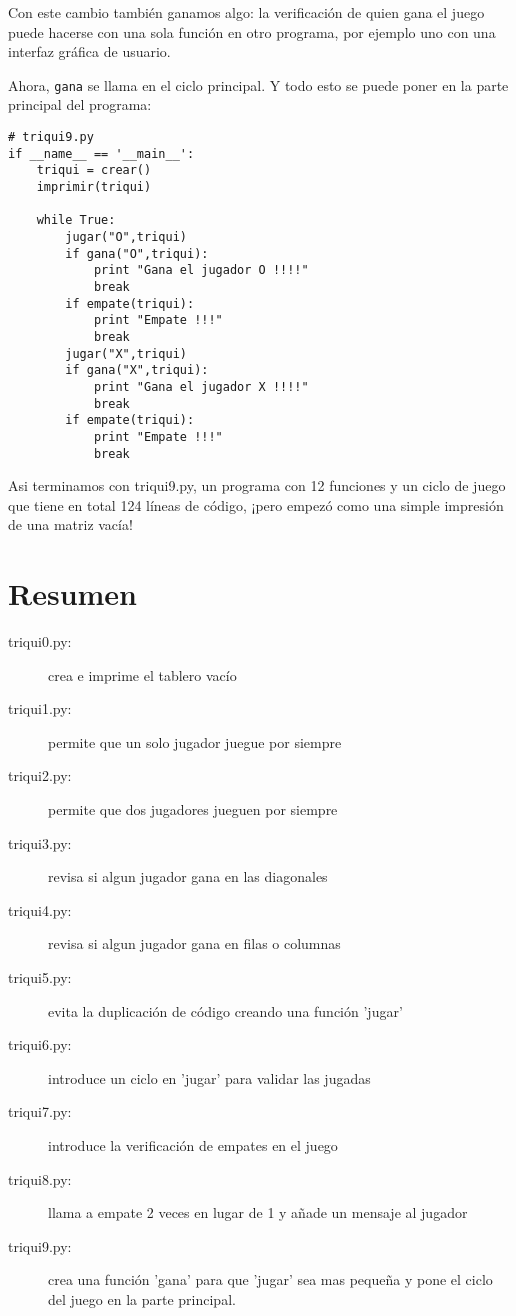 Con este cambio también ganamos algo: la verificación de quien gana el juego
puede hacerse con una sola función en otro programa, por ejemplo uno con 
una interfaz gráfica de usuario.

Ahora, \texttt{gana} se llama en el ciclo principal. Y todo esto se puede poner en 
la parte principal del programa:

\begin{verbatim}
# triqui9.py
if __name__ == '__main__':
    triqui = crear()
    imprimir(triqui)

    while True:
        jugar("O",triqui)
        if gana("O",triqui):
            print "Gana el jugador O !!!!"
            break
        if empate(triqui):
            print "Empate !!!"
            break
        jugar("X",triqui)
        if gana("X",triqui):
            print "Gana el jugador X !!!!"
            break
        if empate(triqui):
            print "Empate !!!"
            break
\end{verbatim}
\afterverb

Asi terminamos con triqui9.py, un programa con 12 funciones y un ciclo de juego que
tiene en total 124 líneas de código, ¡pero empezó como una simple impresión de una 
matriz vacía!

\section{Resumen}

\begin{description}
\item[triqui0.py:] crea e imprime el tablero vacío
\item[triqui1.py:] permite que un solo jugador juegue por siempre
\item[triqui2.py:] permite que dos jugadores jueguen por siempre
\item[triqui3.py:] revisa si algun jugador gana en las diagonales
\item[triqui4.py:] revisa si algun jugador gana en filas o columnas
\item[triqui5.py:] evita la duplicación de código creando una función 'jugar'
\item[triqui6.py:] introduce un ciclo en 'jugar' para validar las jugadas 
\item[triqui7.py:] introduce la verificación de empates en el juego
\item[triqui8.py:] llama a empate 2 veces en lugar de 1 y añade un mensaje al jugador
\item[triqui9.py:] crea una función 'gana' para que 'jugar' sea mas pequeña y pone el ciclo 
            del juego en la parte principal.
\end{description}

